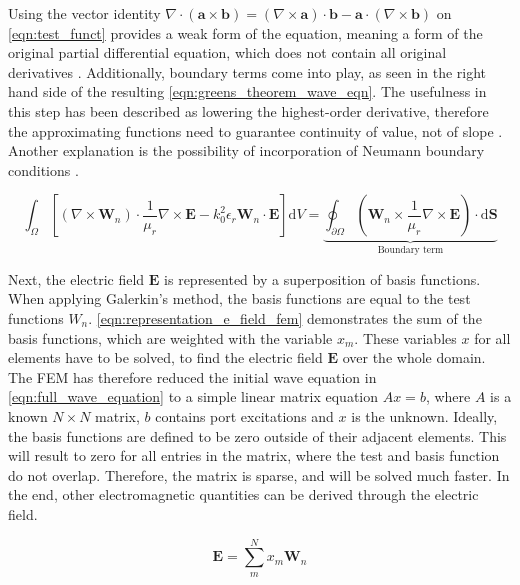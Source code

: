Using the vector identity $\nabla\cdot\left(\mathbf{a}\times\mathbf{b}\right)=\left(\nabla\times\mathbf{a}\right)\cdot\mathbf{b}-\mathbf{a}\cdot\left(\nabla\times\mathbf{b}\right)$  on \autoref{eqn:test_funct} provides a weak form of the equation, meaning a form of the original partial differential equation, which does not contain all original derivatives \cite{Cendes_Lee_1988,Cendes_1991}. Additionally, boundary terms come into play, as seen in the right hand side of the resulting \autoref{eqn:greens_theorem_wave_eqn}. The usefulness in this step has been described as lowering the highest-order derivative, therefore the approximating functions need to guarantee continuity of value, not of slope \cite{huebner2001finite}. Another explanation is the possibility of incorporation of Neumann boundary conditions \cite{Mohsen_1982}. 

\begin{equation}
    \int_\Omega \left[ \left(\nabla \times \mathbf{W}_n \right)\cdot \frac{1}{\mu_r}\nabla\times \mathbf{E}-k_0^2\epsilon_r\mathbf{W}_n\cdot\mathbf{E}\right]\mathrm{d}V=\underbrace{\oint_{\partial\Omega}\left( \mathbf{W}_n\times \frac{1}{\mu_r}\nabla\times\mathbf{E}\right)\cdot\mathrm{d}\mathbf{S}}_{\text{Boundary term}}
    \label{eqn:greens_theorem_wave_eqn}
\end{equation}

Next, the electric field $\mathbf{E}$ is represented by a superposition of basis functions. When applying Galerkin's method, the basis functions are equal to the test functions $W_n$. \autoref{eqn:representation_e_field_fem} demonstrates the sum of the basis functions, which are weighted with the variable $x_m$. These variables $x$ for all elements have to be solved, to find the electric field $\mathbf{E}$ over the whole domain. The FEM has therefore reduced the initial wave equation in \autoref{eqn:full_wave_equation} to a simple linear matrix equation $Ax=b$, where $A$ is a known $N\times N$ matrix, $b$ contains port excitations and $x$ is the unknown. Ideally, the basis functions are defined to be zero outside of their adjacent elements. This will result to zero for all entries in the matrix, where the test and basis function do not overlap. Therefore, the matrix is sparse, and will be solved much faster. In the end, other electromagnetic quantities can be derived through the electric field.

\begin{equation}
    \mathbf{E}=\sum^N_mx_m\mathbf{W}_n
    \label{eqn:representation_e_field_fem}
\end{equation}

